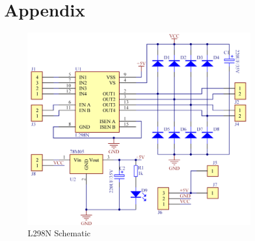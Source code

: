 \documentclass[a4paper,12pt]{article}
\begin{document}
\section{Appendix}
\begin{figure}[H]
    \begin{center}
        \includegraphics[width=10cm]{images/l298nschematic.png}
        \caption{L298N Schematic}
        \label{fig:l298nschematic}
    \end{center}
\end{figure}
\end{document}

